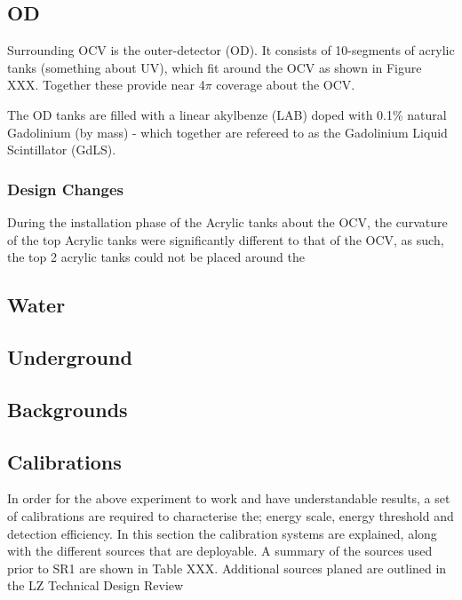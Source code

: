 \subsection{OD}
\par
Surrounding OCV is the outer-detector (OD).
It consists of 10-segments of acrylic tanks (something about UV), which fit around the OCV as shown in Figure XXX.
Together these provide near 4$\pi$ coverage about the OCV.

\par
The OD tanks are filled with a linear akylbenze (LAB) doped with 0.1\% natural Gadolinium (by mass) - which together are refereed to as the Gadolinium Liquid Scintillator (GdLS).



\par



\subsubsection{Design Changes}
\par
During the installation phase of the Acrylic tanks about the OCV, the curvature of the top Acrylic tanks were significantly different to that of the OCV, as such, the top 2 acrylic tanks could not be placed around the 

\par


\subsection{Water}

\subsection{Underground}

\subsection{Backgrounds}

\subsection{Calibrations}
\par
In order for the above experiment to work and have understandable results, a set of calibrations are required to characterise the; energy scale, energy threshold and detection efficiency.
In this section the calibration systems are explained, along with the different sources that are deployable.
A summary of the sources used prior to SR1 are shown in Table XXX. 
Additional sources planed are outlined in the LZ Technical Design Review \cite{LZ_TechnicalDesignReview_ref}

